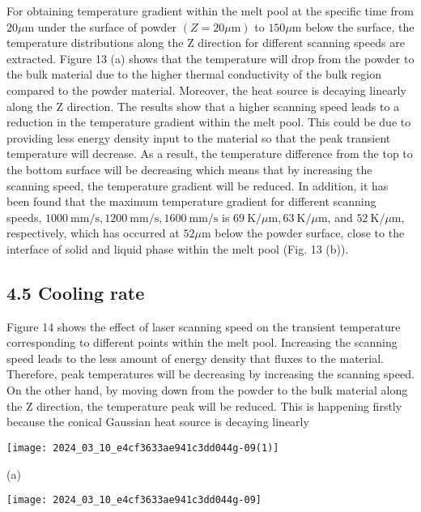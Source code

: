 \documentclass[10pt]{article}
\begin{document}
For obtaining temperature gradient within the melt pool at the specific time from $20 \mu \mathrm{m}$ under the surface of powder $(Z=20 \mu \mathrm{m})$ to $150 \mu \mathrm{m}$ below the surface, the temperature distributions along the $\mathrm{Z}$ direction for different scanning speeds are extracted. Figure 13 (a) shows that the temperature will drop from the powder to the bulk material due to the higher thermal conductivity of the bulk region compared to the powder material. Moreover, the heat source is decaying linearly along the $\mathrm{Z}$ direction. The results show that a higher scanning speed leads to a reduction in the temperature gradient within the melt pool. This could be due to providing less energy density input to the material so that the peak transient temperature will decrease. As a result, the temperature difference from the top to the bottom surface will be decreasing which means that by increasing the scanning speed, the temperature gradient will be reduced. In addition, it has been found that the maximum temperature gradient for different scanning speeds, $1000 \mathrm{~mm} / \mathrm{s}, 1200 \mathrm{~mm} / \mathrm{s}, 1600 \mathrm{~mm} / \mathrm{s}$ is $69 \mathrm{~K} / \mu \mathrm{m}, 63 \mathrm{~K} / \mu \mathrm{m}$, and $52 \mathrm{~K} / \mu \mathrm{m}$, respectively, which has occurred at $52 \mu \mathrm{m}$ below the powder surface, close to the interface of solid and liquid phase within the melt pool (Fig. 13 (b)).

\subsection*{4.5 Cooling rate}
Figure 14 shows the effect of laser scanning speed on the transient temperature corresponding to different points within the melt pool. Increasing the scanning speed leads to the less amount of energy density that fluxes to the material. Therefore, peak temperatures will be decreasing by increasing the scanning speed. On the other hand, by moving down from the powder to the bulk material along the $\mathrm{Z}$ direction, the temperature peak will be reduced. This is happening firstly because the conical Gaussian heat source is decaying linearly

\begin{center}
\texttt{[image: 2024\_03\_10\_e4cf3633ae941c3dd044g-09(1)]}
\end{center}

(a)

\begin{center}
\texttt{[image: 2024\_03\_10\_e4cf3633ae941c3dd044g-09]}
\end{center}
\end{document}
